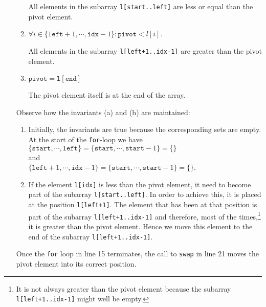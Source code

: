 \begin{enumerate}
\begin{enumerate}
            All elements in the subarray \texttt{l[start..left]} are less or equal than the pivot element.
      \item $\forall i \in \{ \mathtt{left}+1,\cdots,\mathtt{idx}-1\}:\mathtt{pivot} < l[i]$.

            All elements in the subarray \texttt{l[left+1..idx-1]} are greater than the pivot
            element.
      \item $\texttt{pivot} = \mathtt{l[end]}$

            The pivot element itself is at the end of the array.
      \end{enumerate}
      Observe how the invariants (a) and (b) are maintained:
      \begin{enumerate}
      \item Initially, the invariants are true because the corresponding sets are empty.
            At the start of the \texttt{for}-loop we have
            \\[0.2cm]
            \hspace*{1.3cm}
            $\{ \mathtt{start}, \cdots, \mathtt{left} \} = \{ \mathtt{start}, \cdots, \mathtt{start} - 1\} = \{\}$
            \\
            and
            \\
            \hspace*{1.3cm}
            $\{ \mathtt{left}+1,\cdots,\mathtt{idx}-1\} =  \{ \mathtt{start},\cdots,\mathtt{start}-1\}=\{\}$.
      \item If the element \texttt{l[idx]} is less than the
            pivot element, it need to become part of the subarray \texttt{l[start..left]}.  In order to
            achieve this, it is placed at the position \texttt{l[left+1]}.  The element that has been at
            that position is part of the subarray \texttt{l[left+1..idx-1]} and therefore, most of the times,\footnote{It is not always greater than the pivot element
      because the subarray \texttt{l[left+1..idx-1]} might well be empty.}
            it is greater than the pivot element.  
            Hence we move this element to the end of the subarray \texttt{l[left+1..idx-1]}.
      \end{enumerate}
      Once the \texttt{for} loop in line 15 terminates, the call to \texttt{swap} in line 21 moves
      the pivot element into its correct position.  
\end{enumerate}


